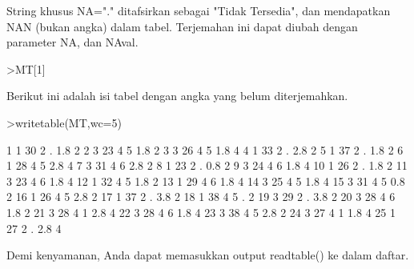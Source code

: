 \documentclass[a4paper,10pt]{article}
\begin{document}
\begin{eulernotebook}
\begin{eulercomment}
\begin{eulercomment}
\begin{eulercomment}
\begin{eulercomment}
\begin{eulercomment}
\begin{eulercomment}
\begin{eulercomment}
\begin{eulercomment}
\begin{eulercomment}
\begin{eulercomment}
\begin{eulercomment}
\begin{eulercomment}
\begin{eulercomment}
\begin{eulercomment}
\begin{eulercomment}
\begin{eulercomment}
\begin{eulercomment}
\begin{eulercomment}
\begin{eulercomment}
\begin{eulercomment}
\begin{eulercomment}
\begin{eulercomment}
\begin{eulercomment}
\begin{eulercomment}
\begin{eulercomment}
\begin{eulercomment}
\begin{eulercomment}
\begin{eulercomment}
\begin{eulercomment}
\begin{eulercomment}
\begin{eulercomment}
\begin{eulercomment}
\begin{eulercomment}
String khusus NA="." ditafsirkan sebagai "Tidak Tersedia", dan
mendapatkan NAN (bukan angka) dalam tabel. Terjemahan ini dapat diubah
dengan parameter NA, dan NAval.
\end{eulercomment}
\begin{eulerprompt}
>MT[1]
\end{eulerprompt}
\begin{euleroutput}
  [1,  1,  30,  2,  NAN,  1.8,  2]
\end{euleroutput}
\begin{eulercomment}
Berikut ini adalah isi tabel dengan angka yang belum diterjemahkan.
\end{eulercomment}
\begin{eulerprompt}
>writetable(MT,wc=5)
\end{eulerprompt}
\begin{euleroutput}
      1    1   30    2    .  1.8    2
      2    3   23    4    5  1.8    2
      3    3   26    4    5  1.8    4
      4    1   33    2    .  2.8    2
      5    1   37    2    .  1.8    2
      6    1   28    4    5  2.8    4
      7    3   31    4    6  2.8    2
      8    1   23    2    .  0.8    2
      9    3   24    4    6  1.8    4
     10    1   26    2    .  1.8    2
     11    3   23    4    6  1.8    4
     12    1   32    4    5  1.8    2
     13    1   29    4    6  1.8    4
     14    3   25    4    5  1.8    4
     15    3   31    4    5  0.8    2
     16    1   26    4    5  2.8    2
     17    1   37    2    .  3.8    2
     18    1   38    4    5    .    2
     19    3   29    2    .  3.8    2
     20    3   28    4    6  1.8    2
     21    3   28    4    1  2.8    4
     22    3   28    4    6  1.8    4
     23    3   38    4    5  2.8    2
     24    3   27    4    1  1.8    4
     25    1   27    2    .  2.8    4
\end{euleroutput}
\begin{eulercomment}
Demi kenyamanan, Anda dapat memasukkan output readtable() ke dalam
daftar.

\end{eulercomment}
\end{eulercomment}
\end{eulercomment}
\end{eulercomment}
\end{eulercomment}
\end{eulercomment}
\end{eulercomment}
\end{eulercomment}
\end{eulercomment}
\end{eulercomment}
\end{eulercomment}
\end{eulercomment}
\end{eulercomment}
\end{eulercomment}
\end{eulercomment}
\end{eulercomment}
\end{eulercomment}
\end{eulercomment}
\end{eulercomment}
\end{eulercomment}
\end{eulercomment}
\end{eulercomment}
\end{eulercomment}
\end{eulercomment}
\end{eulercomment}
\end{eulercomment}
\end{eulercomment}
\end{eulercomment}
\end{eulercomment}
\end{eulercomment}
\end{eulercomment}
\end{eulercomment}
\end{eulercomment}
\end{eulernotebook}
\end{document}

